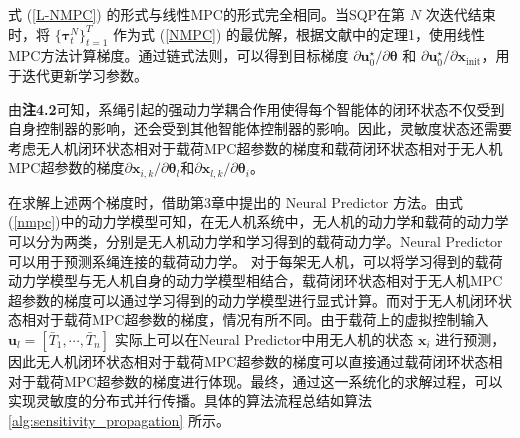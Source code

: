 \documentclass[lang=chs, degree=master, blindreview=false, winfonts=true]{yanputhesis}
\begin{document}
式 (\ref{L-NMPC}) 的形式与线性MPC的形式完全相同。当SQP在第 \( N \) 次迭代结束时，将 \( \{\bm \tau_t^N \}_{t=1}^{T} \) 作为式 (\ref{NMPC}) 的最优解，根据文献中的定理1，使用线性MPC方法计算梯度。通过链式法则，可以得到目标梯度 \( {\partial \bm u_0^\star}/{\partial \bm \theta} \) 和 \( {\partial \bm u_0^\star}/{\partial \bm x_{\text{init}}} \)，用于迭代更新学习参数。

由\textbf{注4.2}可知，系绳引起的强动力学耦合作用使得每个智能体的闭环状态不仅受到自身控制器的影响，还会受到其他智能体控制器的影响。因此，灵敏度状态还需要考虑无人机闭环状态相对于载荷MPC超参数的梯度和载荷闭环状态相对于无人机MPC超参数的梯度${\partial \bm{x}_{i,k}}/{\partial \bm{\theta}_l}$和${\partial \bm{x}_{l,k}}/{\partial \bm{\theta}_i}$。

在求解上述两个梯度时，借助第3章中提出的 Neural Predictor 方法。由式(\ref{nmpc})中的动力学模型可知，在无人机系统中，无人机的动力学和载荷的动力学可以分为两类，分别是无人机动力学和学习得到的载荷动力学。Neural Predictor可以用于预测系绳连接的载荷动力学。
对于每架无人机，可以将学习得到的载荷动力学模型与无人机自身的动力学模型相结合，载荷闭环状态相对于无人机MPC超参数的梯度可以通过学习得到的动力学模型进行显式计算。而对于无人机闭环状态相对于载荷MPC超参数的梯度，情况有所不同。由于载荷上的虚拟控制输入 \( \bm{u}_l = \left[ \bar{T}_1, \cdots, \bar{T}_n \right] \) 实际上可以在Neural Predictor中用无人机的状态 \( \bm{x}_i \) 进行预测，因此无人机闭环状态相对于载荷MPC超参数的梯度可以直接通过载荷闭环状态相对于载荷MPC超参数的梯度进行体现。最终，通过这一系统化的求解过程，可以实现灵敏度的分布式并行传播。具体的算法流程总结如算法 \ref{alg:sensitivity_propagation} 所示。
\end{document}
